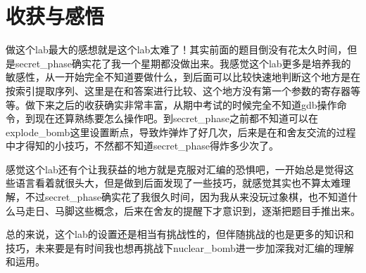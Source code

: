 \documentclass{article}
\begin{document}
\section{收获与感悟}
做这个lab最大的感想就是这个lab太难了！其实前面的题目倒没有花太久时间，但是secret\_phase确实花了我一个星期都没做出来。我感觉这个lab更多是培养我的敏感性，从一开始完全不知道要做什么，到后面可以比较快速地判断这个地方是在按索引提取序列、这里是在和答案进行比较、这个地方没有第一个参数的寄存器等等。做下来之后的收获确实非常丰富，从期中考试的时候完全不知道gdb操作命令，到现在还算熟练要怎么操作吧。到secret\_phase之前都不知道可以在explode\_bomb这里设置断点，导致炸弹炸了好几次，后来是在和舍友交流的过程中才得知的小技巧，不然都不知道secret\_phase得炸多少次了。

感觉这个lab还有个让我获益的地方就是克服对汇编的恐惧吧，一开始总是觉得这些语言看着就很头大，但是做到后面发现了一些技巧，就感觉其实也不算太难理解，不过secret\_phase确实花了我很久时间，因为我从来没玩过象棋，也不知道什么马走日、马脚这些概念，后来在舍友的提醒下才意识到，逐渐把题目手推出来。

总的来说，这个lab的设置还是相当有挑战性的，但伴随挑战的也是更多的知识和技巧，未来要是有时间我也想再挑战下nuclear\_bomb进一步加深我对汇编的理解和运用。
\end{document}
